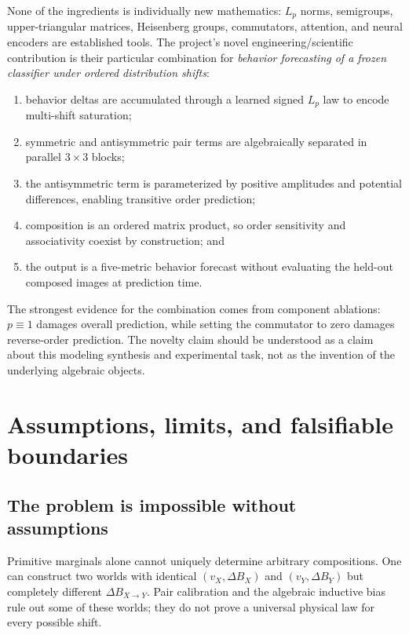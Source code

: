 \documentclass[11pt,a4paper]{article}
\newcommand{\dB}{\Delta B}
\begin{document}
None of the ingredients is individually new mathematics: $L_p$ norms,
semigroups, upper-triangular matrices, Heisenberg groups, commutators,
attention, and neural encoders are established tools.  The project's novel
engineering/scientific contribution is their particular combination for
\emph{behavior forecasting of a frozen classifier under ordered distribution
shifts}:
\begin{enumerate}
  \item behavior deltas are accumulated through a learned signed $L_p$ law to
  encode multi-shift saturation;
  \item symmetric and antisymmetric pair terms are algebraically separated in
  parallel $3\times3$ blocks;
  \item the antisymmetric term is parameterized by positive amplitudes and
  potential differences, enabling transitive order prediction;
  \item composition is an ordered matrix product, so order sensitivity and
  associativity coexist by construction; and
  \item the output is a five-metric behavior forecast without evaluating the
  held-out composed images at prediction time.
\end{enumerate}
The strongest evidence for the combination comes from component ablations:
$p\equiv1$ damages overall prediction, while setting the commutator to zero
damages reverse-order prediction.  The novelty claim should be understood as a
claim about this modeling synthesis and experimental task, not as the invention
of the underlying algebraic objects.

\section{Assumptions, limits, and falsifiable boundaries}

\subsection{The problem is impossible without assumptions}

Primitive marginals alone cannot uniquely determine arbitrary compositions.
One can construct two worlds with identical $(v_X,\dB_X)$ and
$(v_Y,\dB_Y)$ but completely different $\dB_{X\to Y}$.  Pair calibration and
the algebraic inductive bias rule out some of these worlds; they do not prove a
universal physical law for every possible shift.
\end{document}
